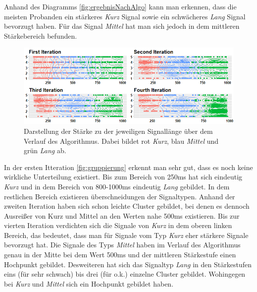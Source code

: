 Anhand des Diagramms \autoref{fig:ergebnisNachAlgo} kann man erkennen, dass die meisten Probanden ein st{\"a}rkeres \textit{Kurz} Signal sowie ein schw{\"a}cheres \textit{Lang} Signal bevorzugt haben. F{\"u}r das Signal \textit{Mittel} hat man sich jedoch in dem mittleren St{\"a}rkebereich befunden.

\begin{figure}[htbp] 
            \centering
   	\includegraphics[width=\textwidth]{pics/analyse/algo/gruppierung.png}
	\caption{Darstellung der St{\"a}rke zu der jeweiligen Signall{\"a}nge {\"u}ber dem Verlauf des Algorithmus. Dabei bildet rot \textit{Kurz}, blau \textit{Mittel} und gr{\"u}n \textit{Lang} ab.}
	\label{fig:gruppierung}
\end{figure}

In der ersten Itteration \autoref{fig:gruppierung} erkennt man sehr gut, dass es noch keine wirkliche Unterteilung existiert.
Bis zum Bereich von 250ms hat sich eindeutig \textit{Kurz} und in dem Bereich von 800-1000ms eindeutig \textit{Lang} gebildet. In dem restlichen Bereich existieren {\"u}berschneidungen der Signaltypen.
Anhand der zweiten Iteration haben sich schon leichte Cluster gebildet, bei denen es dennoch Ausrei{\ss}er von Kurz und Mittel an den Werten nahe 500ms existieren. 
Bis zur vierten Iteration verdichten sich die Signale von \textit{Kurz} in dem oberen linken Bereich, das bedeutet, dass man f{\"u}r Signale vom Typ \textit{Kurz} eher st{\"a}rkere Signale bevorzugt hat. 
Die Signale des Typs \textit{Mittel} haben im Verlauf des Algorithmus genau in der Mitte bei dem Wert 500ms und der mittleren St{\"a}rkestufe einen Hochpunkt gebildet. 
Desweiteren hat sich das Signaltyp \textit{Lang} in den St{\"a}rkestufen eins (f{\"u}r sehr schwach) bis drei (f{\"u}r o.k.) einzelne Cluster gebildet. 
Wohingegen bei \textit{Kurz} und \textit{Mittel} sich ein Hochpunkt gebildet haben.

